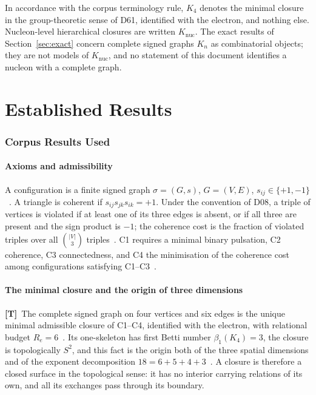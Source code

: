 \documentclass[11pt,a4paper]{article}
\theoremstyle{plain}
\theoremstyle{definition}
\theoremstyle{remark}
\newcommand{\statT}{\textbf{[T]}}
\begin{document}
In accordance with the corpus terminology rule, $K_4$ denotes the minimal closure in the group-theoretic sense of D61, identified with the electron, and nothing else. Nucleon-level hierarchical closures are written $K_{\mathrm{nuc}}$. The exact results of Section~\ref{sec:exact} concern complete signed graphs $K_n$ as combinatorial objects; they are not models of $K_{\mathrm{nuc}}$, and no statement of this document identifies a nucleon with a complete graph.

\part{Established Results}

\section{Corpus Results Used}
\label{sec:corpus}

\subsection{Axioms and admissibility}

A configuration is a finite signed graph $\sigma=(G,s)$, $G=(V,E)$, $s_{ij}\in\{+1,-1\}$~\citep{D01,D67}. A triangle is coherent if $s_{ij}s_{jk}s_{ik}=+1$. Under the convention of D08, a triple of vertices is violated if at least one of its three edges is absent, or if all three are present and the sign product is $-1$; the coherence cost is the fraction of violated triples over all $\binom{|V|}{3}$ triples~\citep{D08}. C1 requires a minimal binary pulsation, C2 coherence, C3 connectedness, and C4 the minimisation of the coherence cost among configurations satisfying C1--C3~\citep{D01,D67}.

\subsection{The minimal closure and the origin of three dimensions}

\statT\ The complete signed graph on four vertices and six edges is the unique minimal admissible closure of C1--C4, identified with the electron, with relational budget $R_e=6$~\citep{D16a}. Its one-skeleton has first Betti number $\beta_1(K_4)=3$, the closure is topologically $S^2$, and this fact is the origin both of the three spatial dimensions and of the exponent decomposition $18=6+5+4+3$~\citep{D23v2,D67}. A closure is therefore a closed surface in the topological sense: it has no interior carrying relations of its own, and all its exchanges pass through its boundary.
\end{document}
